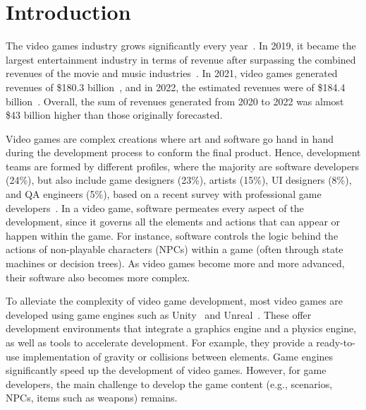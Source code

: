 \section{Introduction}
\label{sec:intro}


The video games industry grows significantly every year~\cite{rykala2020growth}. In 2019, it became the largest entertainment industry in terms of revenue after surpassing the combined revenues of the movie and music industries~\cite{politowski2021game}. In 2021, video games generated revenues of \$180.3 billion~\cite{wijman2021games}, and in 2022, the estimated revenues were of \$184.4 billion~\cite{wijman2022games}. Overall, the sum of revenues generated from 2020 to 2022 was almost \$43 billion higher than those originally forecasted. %


Video games are complex creations where art and software go hand in hand during the development process to conform the final product. Hence, development teams are formed by different profiles, where the majority are software developers (24\%), but also include game designers (23\%), artists (15\%), UI designers (8\%), and QA engineers (5\%), based on a recent survey with professional game developers~\cite{devNation}. In a video game, software permeates every aspect of the development, since it governs all the elements and actions that can appear or happen within the game. For instance, software controls the logic behind the actions of non-playable characters (NPCs) within a game (often through state machines or decision trees). As video games become more and more advanced, their software also becomes more complex.

To alleviate the complexity of video game development, most video games are developed using game engines such as Unity~\cite{unityweb} and Unreal~\cite{unrealweb}. 
These offer development environments that integrate a graphics engine and a physics engine, as well as tools to accelerate development. For example, they provide a ready-to-use implementation of gravity or collisions between elements. Game engines significantly speed up the development of video games. However, for game developers, the main challenge to develop the game content (e.g., scenarios, NPCs, items such as weapons) remains. %

